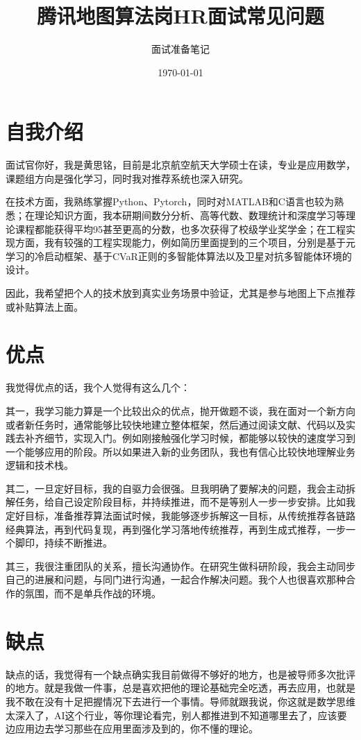 \documentclass[12pt,a4paper]{article}
\title{\textbf{腾讯地图算法岗HR面试常见问题}}
\author{面试准备笔记}
\date{\today}
\begin{document}
\maketitle

\section{自我介绍}
面试官你好，我是黄思铭，目前是北京航空航天大学硕士在读，专业是应用数学，课题组方向是强化学习，同时我对推荐系统也深入研究。

在技术方面，我熟练掌握Python、Pytorch，同时对MATLAB和C语言也较为熟悉；在理论知识方面，我本研期间数分分析、高等代数、数理统计和深度学习等理论课程都能获得平均95甚至更高的分数，也多次获得了校级学业奖学金；在工程实现方面，我有较强的工程实现能力，例如简历里面提到的三个项目，分别是基于元学习的冷启动框架、基于CVaR正则的多智能体算法以及卫星对抗多智能体环境的设计。

因此，我希望把个人的技术放到真实业务场景中验证，尤其是参与地图上下点推荐或补贴算法上面。

\section{优点}
我觉得优点的话，我个人觉得有这么几个：

其一，我学习能力算是一个比较出众的优点，抛开做题不谈，我在面对一个新方向或者新任务时，通常能够比较快地建立整体框架，然后通过阅读文献、代码以及实践去补齐细节，实现入门。例如刚接触强化学习时候，都能够以较快的速度学习到一个能够应用的阶段。所以如果进入新的业务团队，我也有信心比较快地理解业务逻辑和技术栈。

其二，一旦定好目标，我的自驱力会很强。旦我明确了要解决的问题，我会主动拆解任务，给自己设定阶段目标，并持续推进，而不是等别人一步一步安排。比如我定好目标，准备推荐算法面试时候，我能够逐步拆解这一目标，从传统推荐各链路经典算法，再到代码复现，再到强化学习落地传统推荐，再到生成式推荐，一步一个脚印，持续不断推进。

其三，我很注重团队的关系，擅长沟通协作。在研究生做科研阶段，我会主动同步自己的进展和问题，与同门进行沟通，一起合作解决问题。我个人也很喜欢那种合作的氛围，而不是单兵作战的环境。

\section{缺点}
缺点的话，我觉得有一个缺点确实我目前做得不够好的地方，也是被导师多次批评的地方。就是我做一件事，总是喜欢把他的理论基础完全吃透，再去应用，也就是我不敢在没有十足把握情况下去进行一个事情。导师就跟我说，你这就是数学思维太深入了，AI这个行业，等你理论看完，别人都推进到不知道哪里去了，应该要边应用边去学习那些在应用里面涉及到的，你不懂的理论。
\end{document}
